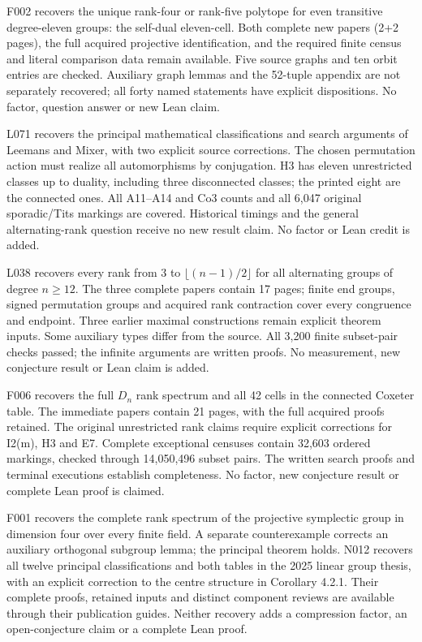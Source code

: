 \documentclass[11pt,a4paper]{article}
\begin{document}
F002 recovers the unique rank-four or rank-five polytope for even transitive
degree-eleven groups: the self-dual eleven-cell. Both complete new papers
(2+2 pages), the full acquired projective identification, and the required
finite census and literal comparison data remain available. Five source
graphs and ten orbit entries are checked. Auxiliary graph lemmas and the
52-tuple appendix are not separately recovered; all forty named statements
have explicit dispositions. No factor, question answer or new Lean claim.

L071 recovers the principal mathematical classifications and search
arguments of Leemans and Mixer, with two explicit source corrections.
The chosen permutation action must realize all automorphisms by
conjugation. H3 has eleven unrestricted classes up to duality, including
three disconnected classes; the printed eight are the connected ones.
All A11--A14 and Co3 counts and all 6,047 original sporadic/Tits markings
are covered. Historical timings and the general alternating-rank question
receive no new result claim. No factor or Lean credit is added.

L038 recovers every rank from $3$ to $\lfloor(n-1)/2\rfloor$ for all alternating
groups of degree $n\geq12$. The three complete papers contain 17 pages;
finite end groups, signed permutation groups and acquired rank contraction
cover every congruence and endpoint. Three earlier maximal constructions
remain explicit theorem inputs. Some auxiliary types differ from the source.
All 3,200 finite subset-pair checks passed; the infinite arguments are
written proofs. No measurement, new conjecture result or Lean claim is added.

F006 recovers the full $D_n$ rank spectrum and all 42 cells in the connected
Coxeter table. The immediate papers contain 21 pages, with the full acquired
proofs retained. The original unrestricted rank claims require explicit
corrections for I2(m), H3 and E7. Complete exceptional censuses contain
32,603 ordered markings, checked through 14,050,496 subset pairs. The written
search proofs and terminal executions establish completeness. No factor,
new conjecture result or complete Lean proof is claimed.

F001 recovers the complete rank spectrum of the projective symplectic group
in dimension four over every finite field. A separate counterexample corrects
an auxiliary orthogonal subgroup lemma; the principal theorem holds. N012
recovers all twelve principal classifications and both tables in the 2025
linear group thesis, with an explicit correction to the centre structure in
Corollary 4.2.1. Their complete proofs, retained inputs and distinct component
reviews are available through their publication guides. Neither recovery
adds a compression factor, an open-conjecture claim or a complete Lean proof.
\end{document}
